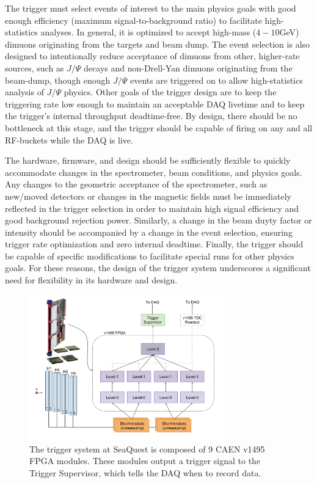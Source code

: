 The trigger must select events of interest to the main physics goals with good enough efficiency (maximum signal-to-background ratio) to facilitate high-statistics analyses. In general, it is optimized to accept high-mass ($4-10$GeV) dimuons originating from the targets and beam dump. The event selection is also designed to intentionally reduce acceptance of dimuons from other, higher-rate sources, such as $J/\Psi$ decays and non-Drell-Yan dimuons originating from the beam-dump, though enough $J/\Psi$ events are triggered on to allow high-statistics analysis of $J/\Psi$ physics. Other goals of the trigger design are to keep the triggering rate low enough to maintain an acceptable DAQ livetime and to keep the trigger's internal throughput deadtime-free. By design, there should be no bottleneck at this stage, and the trigger should be capable of firing on any and all RF-buckets while the DAQ is live.

The hardware, firmware, and design should be sufficiently flexible to quickly accommodate changes in the spectrometer, beam conditions, and physics goals. Any changes to the geometric acceptance of the spectrometer, such as new/moved detectors or changes in the magnetic fields must be immediately reflected in the trigger selection in order to maintain high signal efficiency and good background rejection power. Similarly, a change in the beam duyty factor or intensity should be accompanied by a change in the event selection, ensuring trigger rate optimization and zero internal deadtime. Finally, the trigger should be capable of specific modifications to facilitate special runs for other physics goals. For these reasons, the design of the trigger system underscores a significant need for flexibility in its hardware and design.

\begin{figure}[t]
	\centering
	\includegraphics[width=0.75\textwidth]{figures/apparatus/v1495-trigger.pdf}
	\caption{The trigger system at SeaQuest is composed of 9 CAEN v1495 FPGA modules. These modules output a trigger signal to the Trigger Supervisor, which tells the DAQ when to record data.}
	\label{fig:1495-trigger}
\end{figure}

